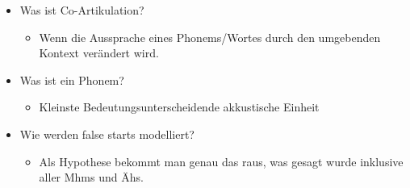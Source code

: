 \begin{itemize}
\begin{itemize}
\end{itemize}
\item Was ist Co-Artikulation?
\begin{itemize}
\item Wenn die Aussprache eines Phonems/Wortes durch den umgebenden Kontext verändert wird.
\end{itemize}
\item Was ist ein Phonem? 
\begin{itemize}
\item Kleinste Bedeutungsunterscheidende akkustische Einheit
\end{itemize}
\item Wie werden false starts modelliert? 
\begin{itemize}
\item Als Hypothese bekommt man genau das raus, was gesagt wurde inklusive aller Mhms und Ähs.
\end{itemize}
\end{itemize}

